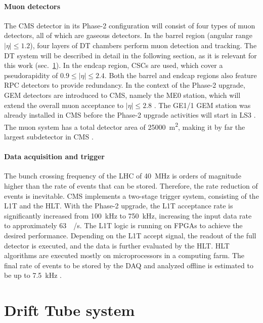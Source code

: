 \paragraph{Muon detectors}
The \ac{CMS} detector in its Phase-2 configuration will consist of four types of muon detectors, all of which are gaseous detectors. In the barrel region (angular range $\left| \eta \right|\leq 1.2$), four layers of \ac{DT} chambers perform muon detection and tracking. The \ac{DT} system will be described in detail in the following section, as it is relevant for this work (sec.\ \ref{sec:CMS-DT}). In the endcap region, \acp{CSC} are used, which cover a pseudorapidity of $0.9\leq \left| \eta \right|\leq 2.4$. Both the barrel and endcap regions also feature \ac{RPC} detectors to provide redundancy. In the context of the Phase-2 upgrade, \ac{GEM} detectors are introduced to \ac{CMS}, namely the ME0 station, which will extend the overall muon acceptance to $\left| \eta \right|\leq 2.8$ \cite{CMS-Main,CMS-Phase2Muon}. The GE1/1 \ac{GEM} station was already installed in \ac{CMS} before the Phase-2 upgrade activities will start in \ac{LS3} \cite{PhD-Mocellin}. The muon system has a total detector area of \SI{25000}{\meter^2}, making it by far the largest subdetector in \ac{CMS} \cite{CMS-Main,CMS-Phase2Muon}.
\paragraph{Data acquisition and trigger}
The bunch crossing frequency of the \ac{LHC} of \SI{40}{\mega\hertz} is orders of magnitude higher than the rate of events that can be stored. Therefore, the rate reduction of events is inevitable. \ac{CMS} implements a two-stage trigger system, consisting of the \ac{L1T} and the \ac{HLT}. With the Phase-2 upgrade, the \ac{L1T} acceptance rate is significantly increased from \SI{100}{\kilo\hertz} to \SI{750}{\kilo\hertz}, increasing the input data rate to approximately \SI{63}{\tera\bit/\second}. The \ac{L1T} logic is running on \acp{FPGA} to achieve the desired performance. Depending on the \ac{L1T} accept signal, the readout of the full detector is executed, and the data is further evaluated by the \ac{HLT}. \ac{HLT} algorithms are executed mostly on microprocessors in a computing farm. The final rate of events to be stored by the \ac{DAQ} and analyzed offline is estimated to be up to \SI{7.5}{\kilo\hertz} \cite{CMS-Main,CMS-Phase2L1Trigger,CMS-Phase2DAQHLT}.

\FloatBarrier
\section{Drift Tube system}
\label{sec:CMS-DT}

